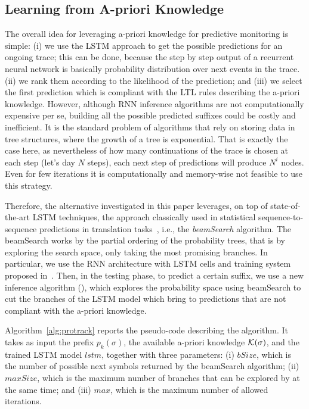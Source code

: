 \subsection{Learning from A-priori Knowledge}
\label{ssec:apriori}

The overall idea for leveraging a-priori knowledge for predictive monitoring is simple: (i) we use the LSTM approach to get the possible predictions for an ongoing trace; this can be done, because the step by step output of a recurrent neural network is basically probability distribution over next events in the trace. (ii) we rank them according to the likelihood of the prediction; and (iii) we select the first prediction which is compliant with the LTL rules describing the a-priori knowledge. However, although RNN inference algorithms are not computationally expensive per se, building all the possible predicted suffixes could be costly and inefficient. It is the standard problem of algorithms that rely on storing data in tree structures, where the growth of a tree is exponential. That is exactly the case here, as nevertheless of how many continuations of the trace is chosen at each step (let's day $N$ steps), each next step of predictions will produce $N^{i}$ nodes. Even for few iterations it is computationally and memory-wise not feasible to use this strategy.

Therefore, the alternative investigated in this paper leverages, on top of state-of-the-art LSTM techniques, the approach classically used in statistical sequence-to-sequence predictions in translation tasks~\cite{Tillmann2003WRD778822778827}, i.e., the \textit{beamSearch} algorithm. The beamSearch works by the partial ordering of the probability trees, that is by exploring the search space, only taking the most promising branches.
In particular, we use the RNN architecture with LSTM cells and training system proposed in~\cite{niek96732}. Then, in the testing phase, to predict a certain suffix, we use a new inference algorithm (\protrack), which explores the probability space using beamSearch to cut the branches of the LSTM model which bring to predictions that are not compliant with the a-priori knowledge.

Algorithm~\ref{alg:protrack} reports the pseudo-code describing the \protrack algorithm. It takes as input the prefix $p_k(\sigma)$, the available a-priori knowledge $\cal{K}(\sigma)$, and the trained LSTM model $lstm$, together with three parameters: (i) $bSize$, which is the number of possible next symbols returned by the beamSearch algorithm; (ii) $maxSize$, which is the maximum number of branches that can be explored by \protrack at the same time; and (iii) $max$, which is the maximum number of allowed iterations.

